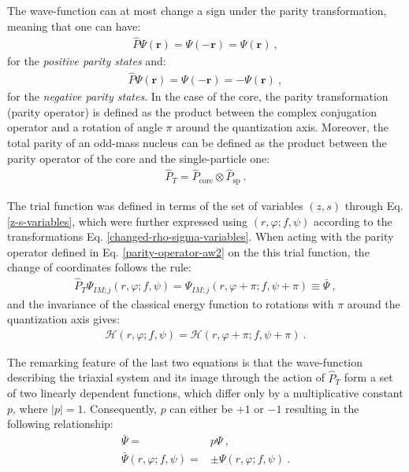 The wave-function can at most change a sign under the parity transformation, meaning that one can have:
\begin{align}
    \hat{P}\Psi(\mathbf{r})=\Psi(-\mathbf{r})=\Psi(\mathbf{r})\ ,
\end{align}
for the \emph{positive parity states} and:
\begin{align}
    \hat{P}\Psi(\mathbf{r})=\Psi(-\mathbf{r})=-\Psi(\mathbf{r})\ ,
\end{align}
for the \emph{negative parity states}. In the case of the core, the parity transformation (parity operator) is defined as the product between the complex conjugation operator and a rotation of angle $\pi$ around the quantization axis. Moreover, the total parity of an odd-mass nucleus can be defined as the product between the parity operator of the core and the single-particle one:
\begin{align}
    \hat{P}_T=\hat{P}_\text{core}\otimes\hat{P}_\text{sp}\ .
    \label{parity-operator-aw2}
\end{align}

The trial function was defined in terms of the set of variables $(z,s)$  through Eq. \ref{z-s-variables}, which were further expressed using $(r,\varphi;f,\psi)$ according to the transformations Eq. \ref{changed-rho-sigma-variables}. When acting with the parity operator defined in Eq. \ref{parity-operator-aw2} on the this trial function, the change of coordinates follows the rule:
\begin{align}
    \hat{P}_T\Psi_{IM;j}(r,\varphi;f,\psi)=\Psi_{IM;j}(r,\varphi+\pi;f,\psi+\pi)\equiv\bar{\Psi}\ ,
\end{align}
and the invariance of the classical energy function to rotations with $\pi$ around the quantization axis gives:
\begin{align}
    \mathcal{H}(r,\varphi;f,\psi)=\mathcal{H}(r,\varphi+\pi;f,\psi+\pi)\ .
\end{align}

The remarking feature of the last two equations is that the wave-function describing the triaxial system and its image through the action of $\hat{P}_T$ form a set of two linearly dependent functions, which differ only by a multiplicative constant $p$, where $|p|=1$. Consequently, $p$ can either be $+1$ or $-1$ resulting in the following relationship:
\begin{align}
    \bar{\Psi}=&p\Psi\nonumber\ ,\\
    \bar{\Psi}(r,\varphi;f,\psi)=&\pm\Psi(r,\varphi;f,\psi)\ .
\end{align}

